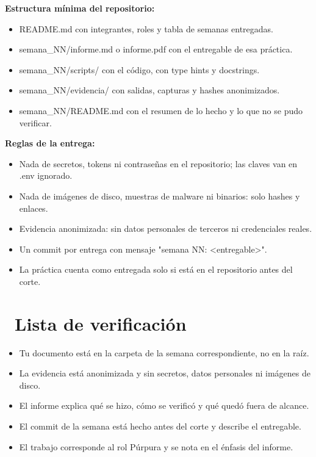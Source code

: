 \documentclass[11pt,a4paper]{article}
\newcommand{\iconotexto}[2]{\textcolor{cyanNeon}{\faIcon{#1}}~#2}
\begin{document}
\textbf{Estructura mínima del repositorio:}

\begin{itemize}[leftmargin=1.4em,itemsep=2pt,topsep=3pt]
  \item README.md con integrantes, roles y tabla de semanas entregadas.
  \item semana\_NN/informe.md o informe.pdf con el entregable de esa práctica.
  \item semana\_NN/scripts/ con el código, con type hints y docstrings.
  \item semana\_NN/evidencia/ con salidas, capturas y hashes anonimizados.
  \item semana\_NN/README.md con el resumen de lo hecho y lo que no se pudo verificar.
\end{itemize}

\textbf{Reglas de la entrega:}

\begin{itemize}[leftmargin=1.4em,itemsep=2pt,topsep=3pt]
  \item Nada de secretos, tokens ni contraseñas en el repositorio; las claves van en .env ignorado.
  \item Nada de imágenes de disco, muestras de malware ni binarios: solo hashes y enlaces.
  \item Evidencia anonimizada: sin datos personales de terceros ni credenciales reales.
  \item Un commit por entrega con mensaje "semana NN: \textless{}entregable\textgreater{}".
  \item La práctica cuenta como entregada solo si está en el repositorio antes del corte.
\end{itemize}

\section{\iconotexto{clipboard-check}{Lista de verificación}}

\begin{itemize}[leftmargin=1.4em,itemsep=2pt,topsep=3pt]
  \item Tu documento está en la carpeta de la semana correspondiente, no en la raíz.
  \item La evidencia está anonimizada y sin secretos, datos personales ni imágenes de disco.
  \item El informe explica qué se hizo, cómo se verificó y qué quedó fuera de alcance.
  \item El commit de la semana está hecho antes del corte y describe el entregable.
  \item El trabajo corresponde al rol Púrpura y se nota en el énfasis del informe.
\end{itemize}
\end{document}
